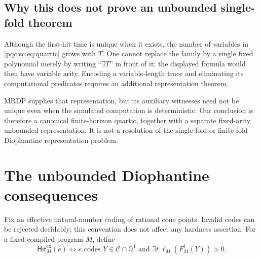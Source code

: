 \documentclass[11pt,letterpaper]{article}
\numberwithin{equation}{section}
\theoremstyle{definition}
\theoremstyle{remark}
\newcommand{\Q}{\mathbb Q}
\newcommand{\srcmark}[1]{\par\noindent{\small\itshape [source~#1]}\par}
\newcommand{\Cone}{\mathcal C}
\newcommand{\HitEx}{\mathsf{Hit}^{\mathrm{ex}}}
\begin{document}
\subsection{Why this does not prove an unbounded single-fold theorem}

Although the first-hit time is unique when it exists, the number of
variables in \eqref{pqc:sc:eq:quartic} grows with $T$. One cannot replace the
family by a single fixed polynomial merely by writing ``$\exists T$''
in front of it: the displayed formula would then have variable arity.
Encoding a variable-length trace and eliminating its computational
predicates requires an additional representation theorem.

MRDP supplies that representation, but its auxiliary witnesses need not be
unique even when the simulated computation is deterministic. Our conclusion
is therefore a canonical finite-horizon quartic, together with a separate
fixed-arity unbounded representation. It is not a resolution of the
single-fold or finite-fold Diophantine representation problem.

\section{The unbounded Diophantine consequences}\label{pqc:sc:sec:unbounded}
\srcmark{14}

Fix an effective natural-number coding of rational cone points. Invalid
codes can be rejected decidably; this convention does not affect any
hardness assertion. For a fixed compiled program $M$, define
\[
 \HitEx_M(e)\iff\text{$e$ codes $Y\in\Cone\cap\Q^4$ and }
                     \exists t\;\ell_M(F_M^t(Y))>0.
\]
\end{document}
